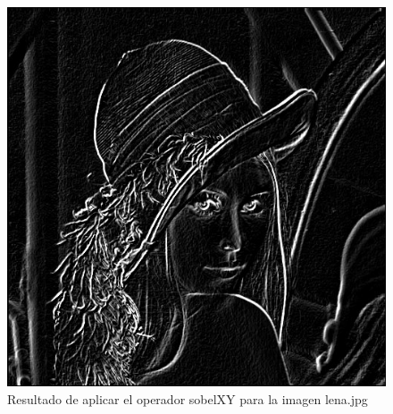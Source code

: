 \documentclass[11pt, a4paper]{article}
\begin{document}
\begin{figure}[ht] %
\centering
\includegraphics[scale=0.30]{sobelXY.jpg}
\caption{Resultado de aplicar el operador sobelXY para la imagen lena.jpg}
\end{figure}
\end{document}
